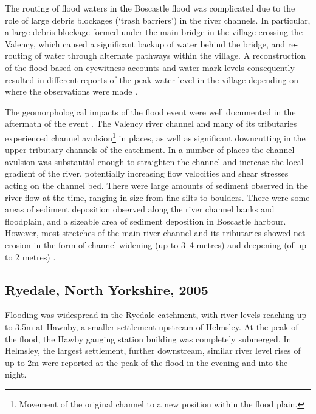 The routing of flood waters in the Boscastle flood was complicated due to the role of large debris blockages (`trash barriers') in the river channels. In particular, a large debris blockage formed under the main bridge in the village crossing the Valency, which caused a significant backup of water behind the bridge, and re-routing of water through alternate pathways within the village. A reconstruction of the flood based on eyewitness accounts and water mark levels consequently resulted in different reports of the peak water level in the village depending on where the observations were made \citep{wallingford2005flooding}. 

The geomorphological impacts of the flood event were well documented in the aftermath of the event \citep{wallingford2005flooding}. The Valency river channel and many of its tributaries experienced channel avulsion\footnote{Movement of the original channel to a new position within the flood plain.} in places, as well as significant downcutting in the upper tributary channels of the catchment. In a number of places the channel avulsion was substantial enough to straighten the channel and increase the local gradient of the river, potentially increasing flow velocities and shear stresses acting on the channel bed. There were large amounts of sediment observed in the river flow at the time, ranging in size from fine silts to boulders. There were some areas of sediment deposition observed along the river channel banks and floodplain, and a sizeable area of sediment deposition in Boscastle harbour. However, most stretches of the main river channel and its tributaries showed net erosion in the form of channel widening (up to 3--4 metres) and deepening (of up to 2 metres) \citep{wallingford2005flooding}.

\subsection{Ryedale, North Yorkshire, 2005}
Flooding was widespread in the Ryedale catchment, with river levels reaching up to 3.5m at Hawnby, a smaller settlement upstream of Helmsley. At the peak of the flood, the Hawby gauging station building was completely submerged\citep{wass2008investigation}. In Helmsley, the largest settlement, further downstream, similar river level rises of up to 2m were reported at the peak of the flood in the evening and into the night. 

